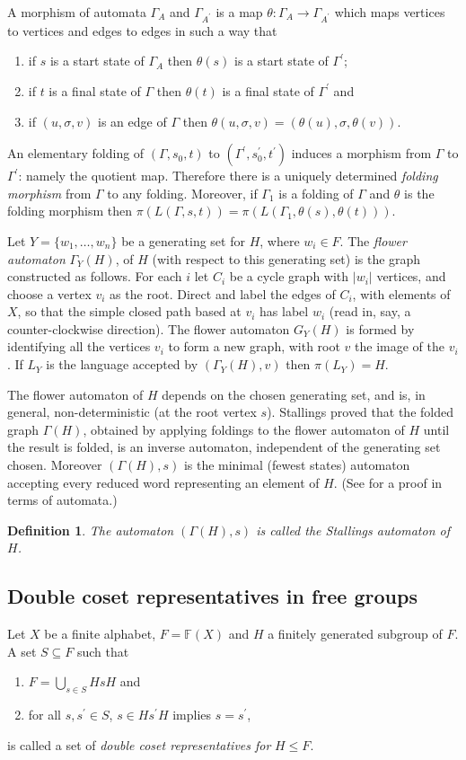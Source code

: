 \documentclass[a4paper,12pt]{article}
\newcommand{\G}{\Gamma }
\newtheorem{definition}[theorem]{Definition}
\numberwithin{equation}{section}
\numberwithin{figure}{section}
\newcommand{\FF}{\ensuremath{\mathbb{F}}}
\newcommand{\maps}{\rightarrow}
\newcommand{\be}{\begin{enumerate}}
\newcommand{\ee}{\end{enumerate}}
\begin{document}
A morphism of automata $\G_A$ and $\G_{A^\prime}$ is a map
$\theta: \G_A\maps \G_{A^\prime}$ which maps vertices to vertices and
edges to edges in such a way that 
\be \item if $s$ is a start state  of
$\G_A$ then $\theta(s)$ is a start state of $\G^\prime$; 
\item if $t$ is a final state of $\G$ then $\theta(t)$ is a final state of
$\G^\prime$ and
\item  if
$(u,\sigma,v)$ is an edge of $\G$ then
$\theta(u,\sigma,v)=(\theta(u),\sigma,\theta(v))$. \ee An
elementary folding of  $(\G,s_0,t)$ to $(\G^\prime,s^\prime_0,
t^\prime)$ induces a morphism from $\G$ to $\G^\prime$: namely the
quotient map. Therefore there is
 a uniquely determined {\em folding morphism}  from $\G$ to any folding. Moreover, if $\G_1$
is a folding of $\G$ and $\theta$ is the folding morphism then
$\pi(L(\G,s,t))= \pi(L(\G_1,\theta(s),\theta(t)))$.




Let $Y=\{w_1,\ldots ,w_n\}$ be a generating set for $H$, where $w_i\in F$.
The {\em flower automaton} $\G_Y(H)$, of $H$ (with respect to this generating set)
is the graph constructed as follows. For each $i$ let $C_i$ be a cycle
graph with $|w_i|$ vertices, and choose a vertex $v_i$ as the root. Direct
and label the edges of $C_i$, with elements of $X$,
so that the simple closed path based at $v_i$ has
label $w_i$ (read in, say, a counter-clockwise direction). The flower
automaton $G_Y(H)$ is formed by identifying all the vertices $v_i$ to form
a new graph, with root $v$ the image of the $v_i$. If $L_Y$ is the language  accepted
by $(\G_Y(H), v)$ then $\pi(L_Y)=H$.


The flower automaton of $H$ depends on the chosen generating set, and is,
in general,
non-deterministic (at the root vertex $s$). Stallings \cite{stallings83}
proved that the folded graph $\G(H)$, obtained by applying foldings to the
flower automaton of $H$ until the result is folded, is an inverse
automaton, independent of the generating set chosen.
Moreover  $(\G(H),s)$ is the minimal (fewest states) automaton accepting
every reduced word representing an element of $H$. (See \cite{BartholdiSilva}
for a proof in terms of automata.)
\begin{definition}
The automaton $(\G(H),s)$ is  called the {\em Stallings automaton} of $H$.
\end{definition}
\subsection{Double coset representatives in free groups}\label{sub:2cosetrepr}
Let $X$ be a finite alphabet, $F=\FF(X)$ and $H$ a finitely generated subgroup
of $F$.
A  set $S\subseteq F$ such that
\be
\item
$F = \displaystyle{\bigcup_{s \in S} HsH}$
and
\item
for all $s, s^\prime \in S$, $s\in H s^\prime H$
implies $s=s^\prime$,
\ee
is called a set of \emph{double coset representatives for} $H\le F$.
\end{document}
